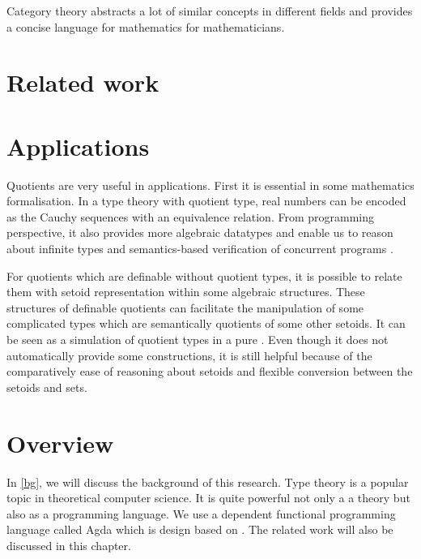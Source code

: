 Category theory abstracts a lot of similar concepts in different
fields and provides a concise language for mathematics for
mathematicians.

\section{Related work}



\section{Applications}


Quotients are very useful in applications. First it is essential in some
mathematics formalisation. 
In a type theory with quotient type, real numbers can be encoded as
the Cauchy sequences with an equivalence relation.
From programming perspective,  it also provides more algebraic
datatypes and enable us to reason about infinite types and
semantics-based verification of concurrent programs \cite{hof:phd}.

For quotients which are definable without quotient types, it is
possible to relate them with setoid representation within some
algebraic structures. 
These structures of definable quotients can facilitate the
manipulation of some complicated types which
are semantically quotients of some other setoids. It can be seen as a
simulation of quotient types in a pure \itt. Even though it does not
automatically provide some constructions, it is still helpful because
of the comparatively ease of reasoning about setoids and flexible
conversion between the setoids and sets.




\section{Overview}





In \autoref{bg}, we will discuss the background of this research. Type theory is a popular topic in
theoretical computer science. It is quite powerful not only a a theory
but also as a programming language. We use a dependent functional
programming language called Agda which is design based on \mltt. The
 related work will also be discussed in this chapter.


